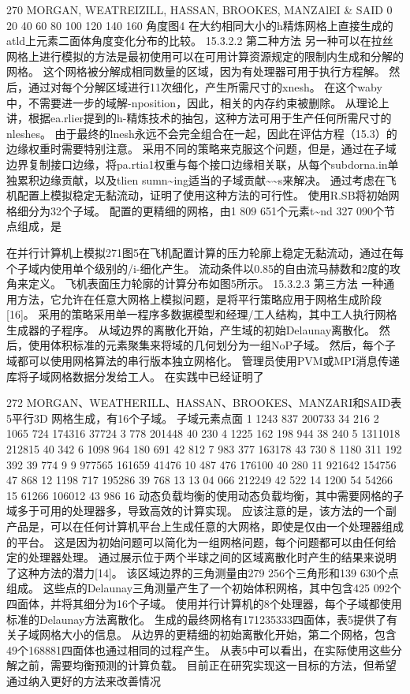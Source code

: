 \documentclass[UTF8,11pt,a4paper,openany,fontset=fandol]{ctexbook}
\begin{document}
270 MORGAN, WEATREIZILL, HASSAN, BROOKES, MANZAlEI \& SAID 0 20 40 60 80 100 120 140 160 角度图4 在大约相同大小的h精炼网格上直接生成的atld上元素二面体角度变化分布的比较。 15.3.2.2 第二种方法 另一种可以在拉丝网格上进行模拟的方法是最初使用可以在可用计算资源规定的限制内生成和分解的网格。 这个网格被分解成相同数量的区域，因为有处理器可用于执行方程解。 然后，通过对每个分解区域进行11次细化，产生所需尺寸的xnesh。 在这个waby中，不需要进一步的域解-nposition，因此，相关的内存约束被删除。 从理论上讲，根据ea.rlier提到的h-精炼技术的抽包，这种方法可用于生产任何所需尺寸的nleshes。 由于最终的lnesh永远不会完全组合在一起，因此在评估方程（15.3）的边缘权重时需要特别注意。 采用不同的策略来克服这个问题，但是，通过在子域边界复制接口边缘，将pa.rtia1权重与每个接口边缘相关联，从每个subdorna.in单独累积边缘贡献，以及tlien sumn\textasciitilde{}ing适当的子域贡献\textasciitilde{}\textasciitilde{}s来解决。 通过考虑在飞机配置上模拟稳定无黏流动，证明了使用这种方法的可行性。 使用R.SB将初始网格细分为32个子域。 配置的更精细的网格，由1 809 651个元素t\textasciitilde{}nd 327 090个节点组成，是

在并行计算机上模拟271图5在飞机配置计算的压力轮廓上稳定无黏流动，通过在每个子域内使用单个级别的/i-细化产生。 流动条件以0.85的自由流马赫数和2度的攻角来定义。 飞机表面压力轮廓的计算分布如图5所示。 15.3.2.3 第三方法 一种通用方法，它允许在任意大网格上模拟问题，是将平行策略应用于网格生成阶段[16]。 采用的策略采用单一程序多数据模型和经理/工人结构，其中工人执行网格生成器的子程序。 从域边界的离散化开始，产生域的初始Delaunay离散化。 然后，使用体积标准的元素聚集来将域的几何划分为一组NoP子域。 然后，每个子域都可以使用网格算法的串行版本独立网格化。 管理员使用PVM或MPI消息传递库将子域网格数据分发给工人。 在实践中已经证明了

272 MORGAN、WEATHERILL、HASSAN、BROOKES、MANZARI和SAID表5平行3D 网格生成，有16个子域。 子域元素点面 1 1243 837 200733 34 216 2 1065 724 174316 37724 3 778 201448 40 230 4 1225 162 198 944 38 240 5 1311018 212815 40 342 6 1098 964 180 691 42 812 7 983 377 163178 43 730 8 1180 311 192 392 39 774 9 9 977565 161659 41476 10 487 476 176100 40 280 11 921642 154756 47 868 12 1198 717 195286 39 768 13 13 04 066 212249 42 522 14 1200 54 54266 15 61266 106012 43 986 16 动态负载均衡的使用动态负载均衡，其中需要网格的子域多于可用的处理器多，导致高效的计算实现。 应该注意的是，该方法的一个副产品是，可以在任何计算机平台上生成任意的大网格，即使是仅由一个处理器组成的平台。 这是因为初始问题可以简化为一组网格问题，每个问题都可以由任何给定的处理器处理。 通过展示位于两个半球之间的区域离散化时产生的结果来说明了这种方法的潜力[14]。 该区域边界的三角测量由279 256个三角形和139 630个点组成。 这些点的Delaunay三角测量产生了一个初始体积网格，其中包含425 092个四面体，并将其细分为16个子域。 使用并行计算机的8个处理器，每个子域都使用标准的Delaunay方法离散化。 生成的最终网格有171235333四面体，表5提供了有关子域网格大小的信息。 从边界的更精细的初始离散化开始，第二个网格，包含49个168881四面体也通过相同的过程产生。 从表5中可以看出，在实际使用这些分解之前，需要均衡预测的计算负载。 目前正在研究实现这一目标的方法，但希望通过纳入更好的方法来改善情况
\end{document}
